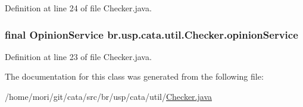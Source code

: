 Definition at line 24 of file Checker.\+java.

\hypertarget{classbr_1_1usp_1_1cata_1_1util_1_1_checker_a492169be77027a44a2658cc9ea46e1fc}{
\subsubsection[{opinion\+Service}]{\setlength{\rightskip}{0pt plus 5cm}final {\bf Opinion\+Service} br.\+usp.\+cata.\+util.\+Checker.\+opinion\+Service\hspace{0.3cm}{\ttfamily [private]}}}\label{classbr_1_1usp_1_1cata_1_1util_1_1_checker_a492169be77027a44a2658cc9ea46e1fc}


Definition at line 23 of file Checker.\+java.



The documentation for this class was generated from the following file\+:\begin{DoxyCompactItemize}
\item 
/home/mori/git/cata/src/br/usp/cata/util/\hyperlink{_checker_8java}{Checker.\+java}\end{DoxyCompactItemize}
